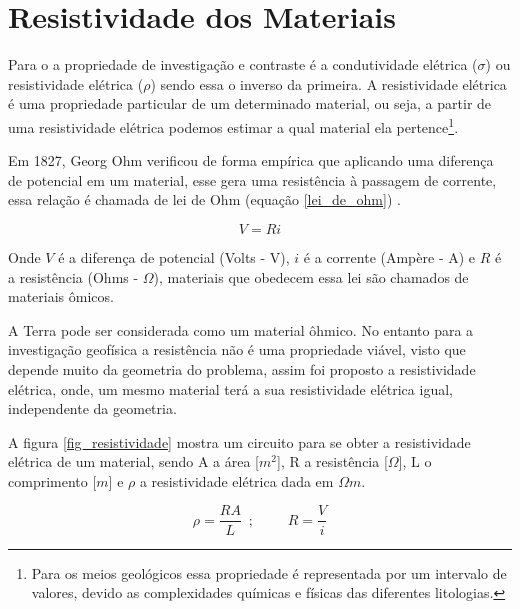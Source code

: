     \section{Resistividade dos Materiais}
    
    Para o \MT a propriedade de investigação e contraste é a condutividade elétrica ($\sigma$) ou resistividade elétrica ($\rho$) sendo essa o inverso da primeira.
    A resistividade elétrica é uma propriedade particular de um determinado material, ou seja, a partir de uma resistividade elétrica podemos estimar a qual material ela pertence\footnote{Para os meios geológicos essa propriedade é representada por um intervalo de valores, devido as complexidades químicas e físicas das diferentes litologias.}.
    
    Em 1827, Georg Ohm verificou de forma empírica que aplicando uma diferença de potencial em um material, esse gera uma resistência à passagem de corrente, essa relação é chamada de lei de Ohm (equação \ref{lei_de_ohm}) \cite{eletromag8hayt}.
    
    \begin{equation}
        \label{lei_de_ohm}
        V = R i
    \end{equation}
    
    Onde $V$ é a diferença de potencial (Volts - V), $i$ é a corrente (Ampère - A) e $R$ é a resistência (Ohms - $\Omega$), materiais que obedecem essa lei são chamados de materiais ômicos.
    
    A Terra pode ser considerada como um material ôhmico. No entanto para a investigação geofísica a resistência não é uma propriedade viável, visto  que depende muito da geometria do problema, assim foi proposto a resistividade elétrica, onde, um mesmo material terá a sua resistividade elétrica igual, independente da geometria.
    
    A figura \ref{fig_resistividade} mostra um circuito para se obter a resistividade elétrica de um material, sendo A a área [$m^2$], R a resistência [$\Omega$], L o comprimento [$m$] e $\rho$ a resistividade elétrica dada em $\Omega m$. 
    
    \begin{equation}
        \label{resistividade}
        \rho = \dfrac{R A}{L}\, \, \, ;\, \, \, \, \, \, \, \, \, \, \, \, \, \,  R = \dfrac{V}{i}
    \end{equation}
    
